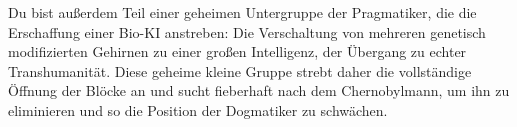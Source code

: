 Du bist außerdem Teil einer geheimen Untergruppe der Pragmatiker, die die
Erschaffung einer Bio-KI anstreben: Die Verschaltung von mehreren genetisch
modifizierten Gehirnen zu einer großen Intelligenz, der Übergang zu echter
Transhumanität. Diese geheime kleine Gruppe strebt daher die vollständige
Öffnung der Blöcke an und sucht fieberhaft nach dem Chernobylmann, um ihn zu
eliminieren und so die Position der Dogmatiker zu schwächen.
